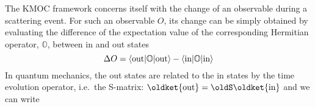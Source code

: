 \documentclass[
  letterpaper,
  DIV=11,
  numbers=noendperiod,
  oneside]{scrreprt}
\begin{document}
The {KMOC} framework concerns itself with the change of an observable
during a scattering event. For such an observable \({O}\), its change
can be simply obtained by evaluating the difference of the expectation
value of the corresponding Hermitian operator, \(\mathbb{O}\), between
in and out states \[
\Delta O=\mathtip{\langle\text{out} \vert  \mathtip{\mathbb{O}}{\text{Operator: }\mathbb{O}} \vert \text{out} \rangle}{\text{Expectation value: }\langle\text{out} \vert  \mathtip{\mathbb{O}}{\text{Operator: }\mathbb{O}} \vert \text{out} \rangle}-\mathtip{\langle\text{in} \vert  \mathtip{\mathbb{O}}{\text{Operator: }\mathbb{O}} \vert \text{in} \rangle}{\text{Expectation value: }\langle\text{in} \vert  \mathtip{\mathbb{O}}{\text{Operator: }\mathbb{O}} \vert \text{in} \rangle}
\] In quantum mechanics, the out states are related to the in states by
the time evolution operator, i.e.~the S-matrix:
\(\oldket{\text{out}}=\oldS\oldket{\text{in}}\) and we can write
\end{document}
